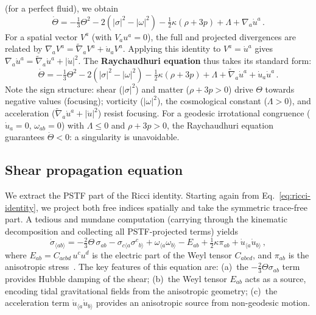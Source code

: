 (for a perfect fluid), we obtain
\begin{equation}
\dot{\Theta}
= -\tfrac{1}{3}\Theta^2
  - 2(|\sigma|^2 - |\omega|^2)
  - \tfrac{1}{2}\kappa(\rho + 3p)
  + \Lambda
  + \nabla_a\dot{u}^a\,.
\end{equation}
For a spatial vector $V^a$ (with $V_a u^a = 0$), the full and
projected divergences are related by
$\nabla_a V^a = \tilde{\nabla}_a V^a + \dot{u}_a V^a$.
Applying this identity to $V^a = \dot{u}^a$ gives
$\nabla_a\dot{u}^a = \tilde{\nabla}_a\dot{u}^a + |\dot{u}|^2$.
The \textbf{Raychaudhuri equation} thus takes its standard form:
\begin{equation}\label{eq:raychaudhuri}
\boxed{
\dot{\Theta}
= -\tfrac{1}{3}\Theta^2
  - 2(|\sigma|^2 - |\omega|^2)
  - \tfrac{1}{2}\kappa(\rho + 3p)
  + \Lambda
  + \tilde{\nabla}_a\dot{u}^a
  + \dot{u}_a\dot{u}^a
}\,.
\end{equation}
Note the sign structure: shear ($|\sigma|^2$) and matter
($\rho + 3p > 0$) drive $\Theta$ towards negative values
(focusing); vorticity ($|\omega|^2$), the cosmological constant
($\Lambda > 0$), and acceleration
($\tilde{\nabla}_a \dot{u}^a + |\dot{u}|^2$) resist focusing.  For
a geodesic irrotational congruence ($\dot{u}_a = 0$,
$\omega_{ab} = 0$) with $\Lambda \leq 0$ and
$\rho + 3p > 0$, the Raychaudhuri equation guarantees
$\dot{\Theta} < 0$: a singularity is unavoidable.


\subsection{Shear propagation equation}\label{sec:shear-prop}

We extract the PSTF part of the Ricci identity.  Starting
again from Eq.~\eqref{eq:ricci-identity}, we project both
free indices spatially and take the symmetric trace-free part.
A tedious and mundane computation (carrying through the kinematic
decomposition and collecting all PSTF-projected terms) yields
\begin{equation}\label{eq:shear-prop}
\dot{\sigma}_{\langle ab\rangle}
= -\tfrac{2}{3}\Theta\,\sigma_{ab}
  - \sigma_{c\langle a}\sigma^c{}_{b\rangle}
  + \omega_{\langle a}\omega_{b\rangle}
  - E_{ab}
  + \tfrac{1}{2}\kappa\pi_{ab}
  + \dot{u}_{\langle a}\dot{u}_{b\rangle}\,,
\end{equation}
where $E_{ab} = C_{acbd}\,u^c u^d$ is the electric part of the
Weyl tensor $C_{abcd}$, and $\pi_{ab}$ is the anisotropic
stress~\cite{EllisVanElst1999,EllisMaartens2012}.  The key
features of this equation are: (a)~the $-\frac{2}{3}\Theta\sigma_{ab}$
term provides Hubble damping of the shear; (b)~the Weyl tensor
$E_{ab}$ acts as a source, encoding tidal gravitational fields
from the anisotropic geometry; (c)~the acceleration term
$\dot{u}_{\langle a}\dot{u}_{b\rangle}$ provides an anisotropic
source from non-geodesic motion.


